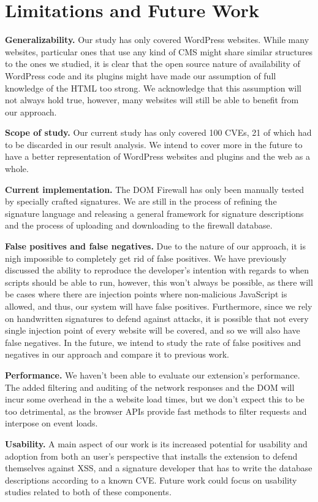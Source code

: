\section{Limitations and Future Work}
\textbf{Generalizability.} Our study has only covered WordPress websites. While many websites, particular ones that use any kind of CMS might share similar structures to the ones we studied, it is clear that the open source nature of availability of WordPress code and its plugins might have made our assumption of full knowledge of the HTML too strong. We acknowledge that this assumption will not always hold true, however, many websites will still be able to benefit from our approach.

\textbf{Scope of study.} Our current study has only covered 100 CVEs, 21 of which had to be discarded in our result analysis. We intend to cover more in the future to have a better representation of WordPress websites and plugins and the web as a whole. 

\textbf{Current implementation.} The DOM Firewall has only been manually tested by specially crafted signatures. We are still in the process of refining the signature language and releasing a general framework for signature descriptions and the process of uploading and downloading to the firewall database.

\textbf{False positives and false negatives.} Due to the nature of our approach, it is nigh impossible to completely get rid of false positives. We have previously discussed the ability to reproduce the developer's intention with regards to when scripts should be able to run, however, this won't always be possible, as there will be cases where there are injection points where non-malicious JavaScript is allowed, and thus, our system will have false positives. Furthermore, since we rely on handwritten signatures to defend against attacks, it is possible that not every single injection point of every website will be covered, and so we will also have false negatives. In the future, we intend to study the rate of false positives and negatives in our approach and compare it to previous work. 

\textbf{Performance.} We haven't been able to evaluate our extension's performance. The added filtering and auditing of the network responses and the DOM will incur some overhead in the a website load times, but we don't expect this to be too detrimental, as the browser APIs provide fast methods to filter requests and interpose on event loads.

\textbf{Usability.} A main aspect of our work is its increased potential for usability and adoption from both an user's perspective that installs the extension to defend themselves against XSS, and a signature developer that has to write the database descriptions according to a known CVE. Future work could focus on usability studies related to both of these components.
